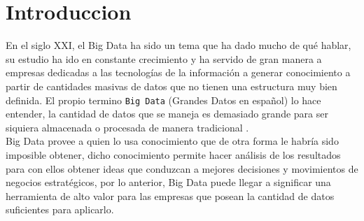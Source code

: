 \section{Introduccion}
En el siglo XXI, el Big Data ha sido un tema que ha dado mucho de qué hablar, su estudio ha ido en constante crecimiento y ha servido de gran manera a empresas dedicadas a las tecnologías de la información a generar conocimiento a partir de cantidades masivas de datos que no tienen una estructura muy bien definida. 
El propio termino \texttt{Big Data} (Grandes Datos en español) lo hace entender, la cantidad de datos que se maneja es demasiado grande para ser siquiera almacenada o procesada de manera tradicional \cite{intro}. 
\\
Big Data provee a quien lo usa conocimiento que de otra forma le habría sido imposible obtener, dicho conocimiento permite hacer análisis de los resultados para con ellos obtener ideas que conduzcan a mejores decisiones y movimientos de negocios estratégicos, por lo anterior, Big Data puede llegar a significar una herramienta de alto valor para las empresas que posean la cantidad de datos suficientes para aplicarlo. 

